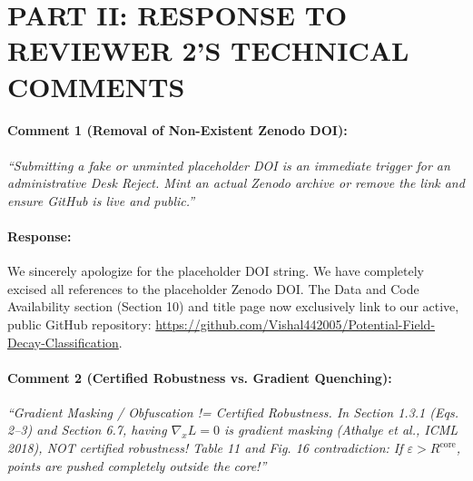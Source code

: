 \documentclass[10pt]{article}
\begin{document}
\section*{PART II: RESPONSE TO REVIEWER 2'S TECHNICAL COMMENTS}

\paragraph{Comment 1 (Removal of Non-Existent Zenodo DOI):}
\textit{``Submitting a fake or unminted placeholder DOI is an immediate trigger for an administrative Desk Reject. Mint an actual Zenodo archive or remove the link and ensure GitHub is live and public.''}

\paragraph{Response:}
We sincerely apologize for the placeholder DOI string. We have completely excised all references to the placeholder Zenodo DOI. The Data and Code Availability section (Section 10) and title page now exclusively link to our active, public GitHub repository: \url{https://github.com/Vishal442005/Potential-Field-Decay-Classification}.

\paragraph{Comment 2 (Certified Robustness vs. Gradient Quenching):}
\textit{``Gradient Masking / Obfuscation != Certified Robustness. In Section 1.3.1 (Eqs. 2--3) and Section 6.7, having $\nabla_x L = 0$ is gradient masking (Athalye et al., ICML 2018), NOT certified robustness! Table 11 and Fig. 16 contradiction: If $\varepsilon > R^{\mathrm{core}}$, points are pushed completely outside the core!''}
\end{document}
